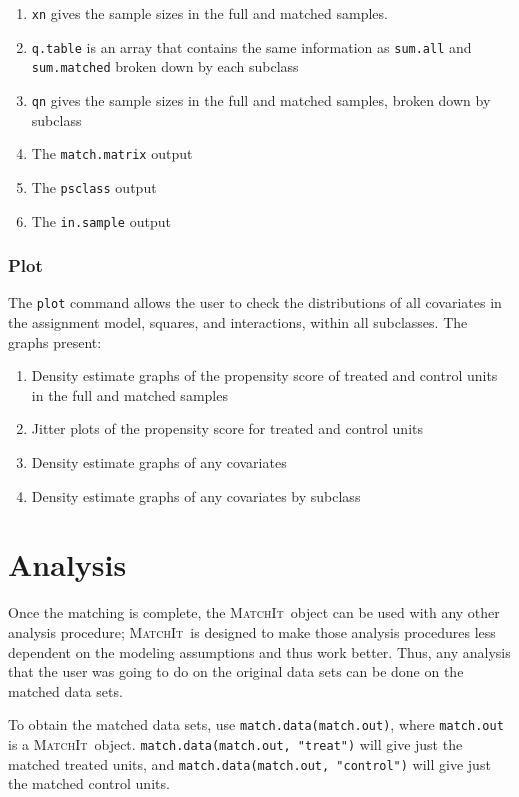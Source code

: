 \documentclass[oneside,letterpaper,titlepage]{article}
\newcommand{\MatchIt}{\textsc{MatchIt}}
\begin{document}
\begin{enumerate}
\item \texttt{xn} gives the sample sizes in the full and matched samples.

\item \texttt{q.table} is an array that contains the same
  information as \texttt{sum.all} and \texttt{sum.matched} broken
  down by each subclass

\item \texttt{qn} gives the sample sizes in the full and matched samples, broken down by subclass
\item The \texttt{match.matrix} output
\item The \texttt{psclass} output
\item The \texttt{in.sample} output
\end{enumerate}

\subsubsection{Plot}
The \texttt{plot} command allows the user to check the
 distributions of all covariates in the assignment model, squares,
 and interactions, within all subclasses.  The graphs present:
\begin{enumerate}
\item Density estimate graphs of the propensity score of treated and control
  units in the full and matched samples 
\item Jitter plots of the propensity score for treated and control
  units 
\item Density estimate graphs of any covariates 
\item Density estimate graphs of any covariates by subclass
\end{enumerate}

\section{Analysis}

Once the matching is complete, the \MatchIt\ object can be used with any other analysis procedure; \MatchIt\ is designed to 
make those analysis procedures less dependent on 
the modeling assumptions and thus work better.  Thus, any analysis that the user was going to do on the original data sets 
can be done on the matched data sets.

To obtain the matched data sets, use {\tt match.data(match.out)}, where {\tt match.out} is a \MatchIt\ object.
{\tt match.data(match.out, "treat")} will give just the matched treated units, and {\tt match.data(match.out, "control")}
will give just the matched control units.  
\end{document}
